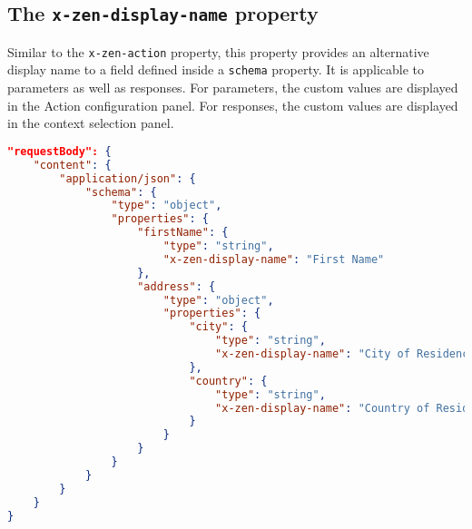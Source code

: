 \subsection{The \texttt{x-zen-display-name} property}
Similar to the \texttt{x-zen-action} property, this property provides an alternative display name to a field defined inside a \texttt{schema} property. It is applicable to parameters as well as responses. For parameters, the custom values are displayed in the Action configuration panel. For responses, the custom values are displayed in the context selection panel.\\
\begin{minipage}{\textwidth}
\begin{lstlisting}[caption={\texttt{x-zen-display-name} usage},label={code:x-zen-display-name},language=json]
"requestBody": {
    "content": {
        "application/json": {
            "schema": {
                "type": "object",
                "properties": {
                    "firstName": {
                        "type": "string",
                        "x-zen-display-name": "First Name"
                    },
                    "address": {
                        "type": "object",
                        "properties": {
                            "city": {
                                "type": "string",
                                "x-zen-display-name": "City of Residence"
                            },
                            "country": {
                                "type": "string",
                                "x-zen-display-name": "Country of Residence"
                            }
                        }
                    }
                }
            }
        }
    }
}
\end{lstlisting}
\end{minipage}
